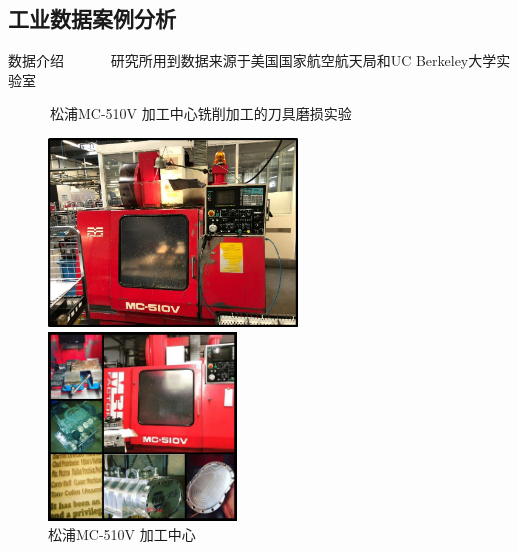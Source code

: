 % 
\subsection{工业数据案例分析}
% 
% 
% 
\begin{frame}{数据介绍}
\ \ \ \ \ \ 研究所用到数据来源于美国国家航空航天局和UC Berkeley大学实验室 \par
\ \ \ \ \ \ 松浦MC-510V 加工中心铣削加工的刀具磨损实验
% 
\begin{figure}[htbp]
\begin{minipage}[t]{0.45\textwidth}
\centering
\includegraphics[height=5cm]{刀具磨损量预测神经网络/机床1.png}
\end{minipage}
\begin{minipage}[t]{0.45\textwidth}
\centering
\includegraphics[height=5cm]{刀具磨损量预测神经网络/机床2.png}
\end{minipage}
\caption{松浦MC-510V 加工中心}
\end{figure}
% 
\end{frame} 
% 
% 
